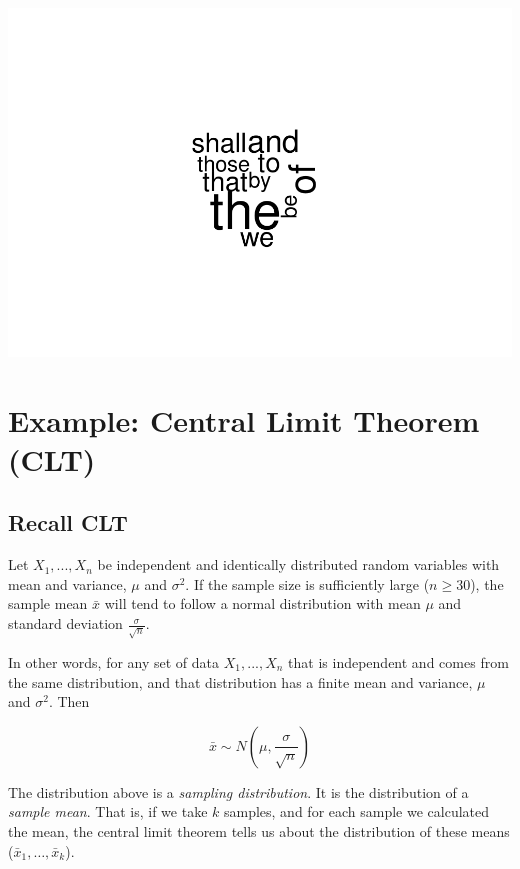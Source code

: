 \documentclass[
]{book}
\begin{document}
\includegraphics{_main_files/figure-latex/unnamed-chunk-226-1.pdf}

\hypertarget{example-central-limit-theorem-clt}{%
\section{Example: Central Limit Theorem (CLT)}\label{example-central-limit-theorem-clt}}

\hypertarget{recall-clt}{%
\subsection{Recall CLT}\label{recall-clt}}

Let \(X_1, ..., X_n\) be independent and identically distributed random variables with mean and variance, \(\mu\) and \(\sigma^2\). If the sample size is sufficiently large (\(n \geq 30\)), the sample mean \(\bar{x}\) will tend to follow a normal distribution with mean \(\mu\) and standard deviation \(\frac{\sigma}{\sqrt{n}}\).

In other words, for any set of data \(X_1, ..., X_n\) that is independent and comes from the same distribution, and that distribution has a finite mean and variance, \(\mu\) and \(\sigma^2\). Then

\[\bar{x} \sim N \left ( \mu, \frac{\sigma}{\sqrt{n}} \right ) \]

The distribution above is a \emph{sampling distribution}. It is the distribution of a \emph{sample mean}. That is, if we take \(k\) samples, and for each sample we calculated the mean, the central limit theorem tells us about the distribution of these means (\(\bar{x}_1, \dots, \bar{x}_k\)).
\end{document}
